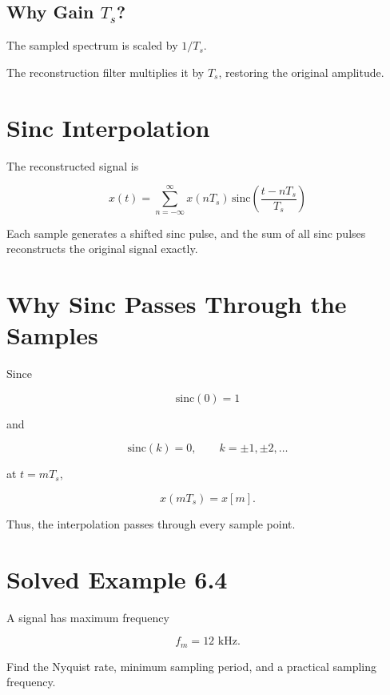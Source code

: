 \subsection{Why Gain \(T_s\)?}

The sampled spectrum is scaled by \(1/T_s\).

The reconstruction filter multiplies it by \(T_s\), restoring the original amplitude.


\section{Sinc Interpolation}

The reconstructed signal is

\[
\boxed{
x(t)=
\sum_{n=-\infty}^{\infty}
x(nT_s)\,
\mathrm{sinc}\left(\frac{t-nT_s}{T_s}\right)
}
\]

Each sample generates a shifted sinc pulse, and the sum of all sinc pulses
reconstructs the original signal exactly.


\section{Why Sinc Passes Through the Samples}

Since

\[
\mathrm{sinc}(0)=1
\]

and

\[
\mathrm{sinc}(k)=0,\qquad k=\pm1,\pm2,\ldots
\]

at \(t=mT_s\),

\[
x(mT_s)=x[m].
\]

Thus, the interpolation passes through every sample point.


\section{Solved Example 6.4}

A signal has maximum frequency

\[
f_m=12\text{ kHz}.
\]

Find the Nyquist rate, minimum sampling period, and a practical sampling frequency.

